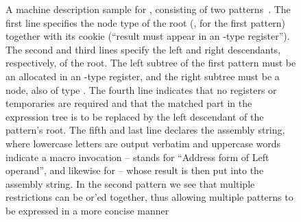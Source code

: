 \begin{figure}
  \centering%
  \begin{lstpage}{106.5mm}%
  \end{lstpage}

  \caption[Example of a machine description for ]%
          {%
            A machine description sample for , consisting of
            two patterns~\cite{Johnson:1981}.
            The first line specifies the node type of the root (\cCode*{+=}, for
            the first pattern) together with its cookie (``result must appear in
            an -type register'').
            The second and third lines specify the left and right descendants,
            respectively, of the root.
            The left subtree of the first pattern must be an 
            allocated in an -type register, and the right subtree must
            be a  node, also of type .
            The fourth line indicates that no registers or temporaries are
            required and that the matched part in the expression tree is to be
            replaced by the left descendant of the pattern's root.
            The fifth and last line declares the assembly string, where
            lowercase letters are output verbatim and uppercase words indicate a
            macro invocation --  stands for ``Address form of Left
            operand'', and likewise for  -- whose result is then put
            into the assembly string.
            In the second pattern we see that multiple restrictions can be
            or'ed together, thus allowing multiple patterns to be
            expressed in a more concise manner%
          }
\end{figure}

